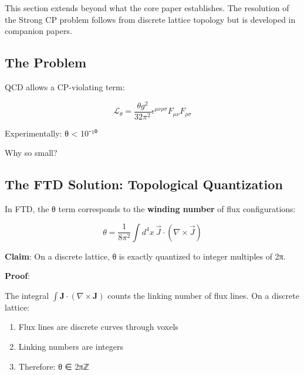 \documentclass[
  11pt,
  letterpaper,
  twoside,
  openany]{book}
\makeatletter
\providecommand{\tightlist}{%
  \setlength{\itemsep}{0pt}\setlength{\parskip}{0pt}}
\let\orig@subsection\subsection
\renewcommand{\subsection}{\needspace{6\baselineskip}\orig@subsection}
\makeatother
\begin{document}
\begin{tcolorbox}[enhanced jigsaw, colbacktitle=quarto-callout-note-color!10!white, titlerule=0mm, bottomtitle=1mm, bottomrule=.15mm, colback=white, arc=.35mm, breakable, toprule=.15mm, title=\textcolor{quarto-callout-note-color}{\faInfo}\hspace{0.5em}{Companion Work}, rightrule=.15mm, coltitle=black, leftrule=.75mm, colframe=quarto-callout-note-color-frame, toptitle=1mm, opacityback=0, opacitybacktitle=0.6, left=2mm]

This section extends beyond what the core paper establishes. The
resolution of the Strong CP problem follows from discrete lattice
topology but is developed in companion papers.

\end{tcolorbox}

\subsection{The Problem}\label{the-problem-1}

QCD allows a CP-violating term:

\[\mathcal{L}_\theta = \frac{\theta g^2}{32\pi^2} \epsilon^{\mu\nu\rho\sigma} F_{\mu\nu}F_{\rho\sigma}\]

Experimentally: \textbar θ\textbar{} \textless{} 10⁻¹⁰

Why so small?

\subsection{The FTD Solution: Topological
Quantization}\label{the-ftd-solution-topological-quantization}

In FTD, the θ term corresponds to the \textbf{winding number} of flux
configurations:

\[\theta = \frac{1}{8\pi^2} \int d^4x \, \vec{J} \cdot (\nabla \times \vec{J})\]

\textbf{Claim}: On a discrete lattice, θ is exactly quantized to integer
multiples of 2π.

\textbf{Proof}:

The integral \(\int \mathbf{J} \cdot (\nabla \times \mathbf{J})\) counts
the linking number of flux lines. On a discrete lattice:

\begin{enumerate}
\def\labelenumi{\arabic{enumi}.}
\tightlist
\item
  Flux lines are discrete curves through voxels
\item
  Linking numbers are integers
\item
  Therefore: θ ∈ 2πℤ
\end{enumerate}
\end{document}
